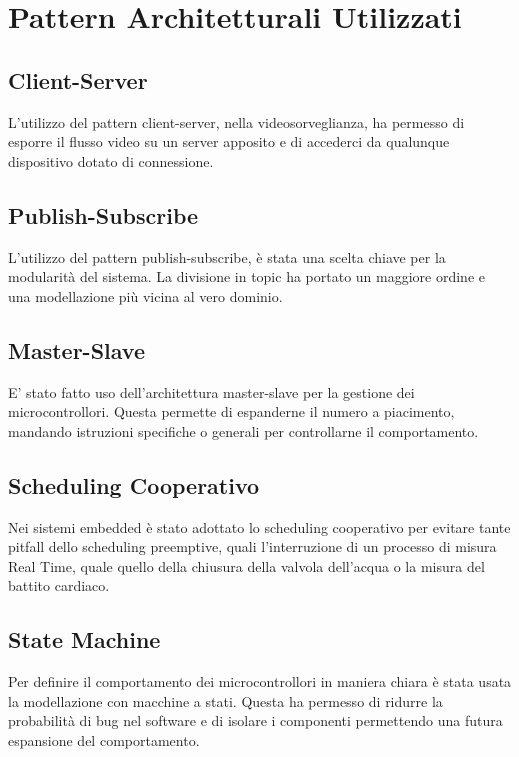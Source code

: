     \section{Pattern Architetturali Utilizzati}
        \subsection{Client-Server}
        L'utilizzo del pattern client-server, nella videosorveglianza, ha permesso di esporre il flusso video su un server apposito e di accederci da qualunque dispositivo dotato di connessione. 
    
        \subsection{Publish-Subscribe}
        L'utilizzo del pattern publish-subscribe, è stata una scelta chiave per la modularità del sistema. La divisione in topic ha portato un maggiore ordine e una modellazione più vicina al vero dominio. 
        
        \subsection{Master-Slave}
        E' stato fatto uso dell'architettura master-slave per la gestione dei microcontrollori. Questa permette di espanderne il numero a piacimento, mandando istruzioni specifiche o generali per controllarne il comportamento.
        
        \subsection{Scheduling Cooperativo}
        Nei sistemi embedded è stato adottato lo scheduling cooperativo per evitare tante pitfall dello scheduling preemptive, quali l'interruzione di un processo di misura Real Time, quale quello della chiusura della valvola dell'acqua o la misura del battito cardiaco.
        
        \subsection{State Machine}
        Per definire il comportamento dei microcontrollori in maniera chiara è stata usata la modellazione con macchine a stati. Questa ha permesso di ridurre la probabilità di bug nel software e di isolare i componenti permettendo una futura espansione del comportamento. 